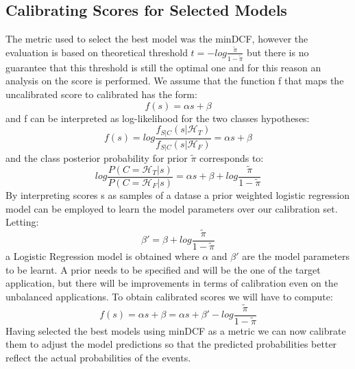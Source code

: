\documentclass{article}
\begin{document}
\subsection{Calibrating Scores for Selected Models}
The metric used to select the best model was the minDCF, however the evaluation is based on theoretical threshold \(t=-log{\frac{\tilde{\pi}}{1-\tilde{\pi}}}\) but there is no guarantee that this threshold is still the optimal one and for this reason an analysis on the score is performed.
We assume that the function f that maps the uncalibrated score to calibrated has the form:
\begin{equation}
    f(s)=\alpha s+\beta
\end{equation}
and f can be interpreted as log-likelihood for the two classes hypotheses:
\begin{equation}
    f(s)=log \frac{f_{S|C}(s|\mathcal{H}_T)}{f_{S|C}(s|\mathcal{H}_F)}=\alpha s+\beta
\end{equation}
and the class posterior probability for prior \(\tilde{\pi}\) corresponds to:
\begin{equation}
    log\frac{P(C=\mathcal{H}_T|s)}{P(C=\mathcal{H}_F|s)}=\alpha s+\beta+log\frac{\tilde{\pi}}{1-\tilde{\pi}}
\end{equation}
By interpreting scores s as samples of a datase a prior weighted logistic regression model can be employed to learn the model parameters over our calibration set. Letting: 
\begin{equation}
    \beta'=\beta+log\frac{\tilde{\pi}}{1-\tilde{\pi}}
\end{equation}
a Logistic Regression model is obtained where \(\alpha\) and \(\beta'\) are the model parameters to be learnt. A prior needs to be specified and will be the one of the target application, but there will be improvements in terms of calibration even on the unbalanced applications. To obtain calibrated scores we will have to compute:
\begin{equation}
    f(s)=\alpha s+\beta=\alpha s+\beta'-log\frac{\tilde{\pi}}{1-\tilde{\pi}}
\end{equation}
Having selected the best models using minDCF as a metric we can now calibrate them to adjust the model predictions so that the predicted probabilities better reflect the actual probabilities of the events. 
\end{document}
